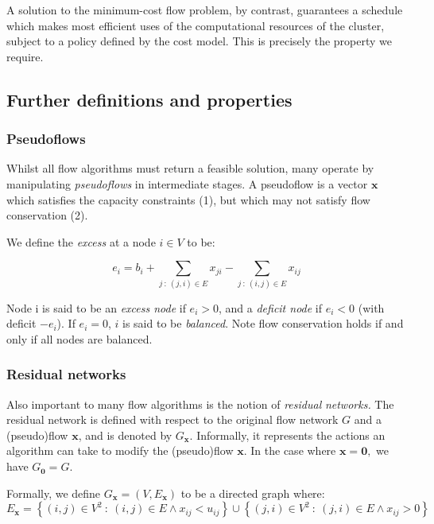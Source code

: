 A solution to the minimum-cost flow problem, by contrast, guarantees
a schedule which makes most efficient uses of the computational resources
of the cluster, subject to a policy defined by the cost model. This
is precisely the property we require.

\subsection{Further definitions and properties}

\subsubsection{Pseudoflows}

Whilst all flow algorithms must return a feasible solution, many operate
by manipulating \emph{pseudoflows} in intermediate stages. A pseudoflow
is a vector $\mathbf{x}$ which satisfies the capacity constraints
(1), but which may not satisfy flow conservation (2).

We define the \emph{excess} at a node $i\in V$ to be:

\begin{equation}
e_{i}=b_{i}+\sum_{j\::\:(j,i)\in E}x_{ji}-\sum_{j\::\:(i,j)\in E}x_{ij}
\end{equation}

Node i is said to be an \emph{excess node} if $e_{i}>0$, and a \emph{deficit
	node} if $e_{i}<0$ (with deficit $-e_{i}$). If $e_{i}=0$, $i$
is said to be \emph{balanced}. Note flow conservation holds if and
only if all nodes are balanced.


\subsubsection{Residual networks}

Also important to many flow algorithms is the notion of \emph{residual}
\emph{networks. }The residual network is defined with respect to the
original flow network $G$ and a (pseudo)flow $\mathbf{x}$, and is
denoted by $G_{\mathbf{x}}$. Informally, it represents the actions
an algorithm can take to modify the (pseudo)flow $\mathbf{x}$. In
the case where $\mathbf{x=0},$ we have $G_{\mathbf{0}}=G$.

Formally, we define $G_{\mathbf{x}}=\left(V,E_{\mathbf{x}}\right)$
to be a directed graph where:
\begin{equation}
E_{\mathbf{x}}=\left\{ (i,j)\in V^{2}\::\:(i,j)\in E\land x_{ij}<u_{ij}\right\} \cup\left\{ (j,i)\in V^{2}\::\:(j,i)\in E\land x_{ij}>0\right\} 
\end{equation}


